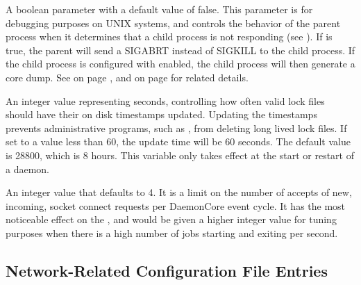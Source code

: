 \begin{description}
\label{param:NotRespondingWantCore}
\item[\Macro{NOT\_RESPONDING\_WANT\_CORE}]
  A boolean parameter with a default value of false.
  This parameter is for debugging purposes on UNIX systems, and
  controls the behavior of the parent process when it determines that
  a child process is not responding (see
  \pageref{param:NotRespondingTimeout}).
  If  is true, the parent 
  will send a SIGABRT instead of SIGKILL to the child process.
  If the child process is configured with
   enabled, the child process will then
  generate a core dump.
  See  on page
  \pageref{param:NotRespondingTimeout}, and 
   on page
  \pageref{param:CreateCoreFiles} for related details.

\label{param:LockFileUpdateInterval}
\item[\Macro{LOCK\_FILE\_UPDATE\_INTERVAL}]
  An integer value representing seconds,
  controlling how often valid lock files should have their on disk
  timestamps updated. Updating the timestamps prevents administrative programs,
  such as , from deleting long lived lock files.
  If set to a value less than 60, the update time will be 60 seconds.
  The default value is 28800, which is 8 hours. 
  This variable only takes effect at the start or restart of a daemon.

\label{param:MaxAcceptsPerCycle}
\item[\Macro{MAX\_ACCEPTS\_PER\_CYCLE}]
  An integer value that defaults to 4.
  It is a limit on the number of accepts of new, incoming, 
  socket connect requests per DaemonCore event cycle.
  It has the most noticeable effect on the ,
  and would be given a higher integer value for tuning purposes when 
  there is a high number of jobs starting and exiting per second.

\end{description}

\subsection{\label{sec:Network-Related-Config-File-Entries}Network-Related Configuration File Entries}

